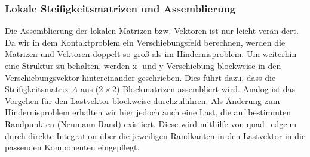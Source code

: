 \subsubsection{Lokale Steifigkeitsmatrizen und Assemblierung}

Die Assemblierung der lokalen Matrizen bzw. Vektoren ist nur leicht verän-dert. Da wir in dem Kontaktproblem ein Verschiebungsfeld berechnen, werden die Matrizen und Vektoren doppelt so groß als im Hindernisproblem. Um weiterhin eine Struktur zu behalten, werden x- und y-Verschiebung blockweise in den Verschiebungsvektor hintereinander geschrieben. Dies führt dazu, dass die Steifigkeitsmatrix $A$ aus ($2\times 2$)-Blockmatrizen assembliert wird. Analog ist das Vorgehen für den Lastvektor blockweise durchzuführen. Als Änderung zum Hindernisproblem erhalten wir hier jedoch auch eine Last, die auf bestimmten Randpunkten (Neumann-Rand) existiert. Diese wird mithilfe von {\ttfamily quad_edge.m} durch direkte Integration über die jeweiligen Randkanten in den Lastvektor in die passenden Komponenten eingepflegt.


